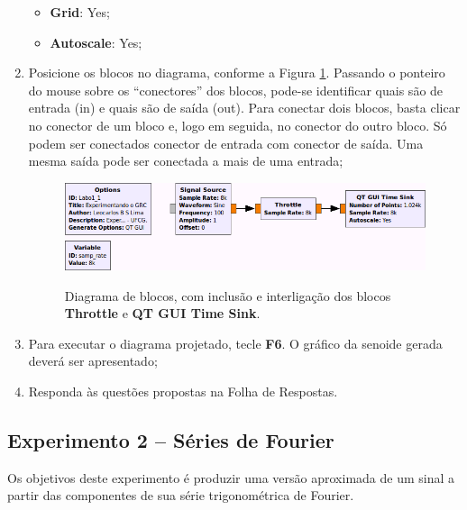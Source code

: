\documentclass[12pt,addpoints]{exam}
\newcommand{\myscale}{0.4}
\begin{document}
\begin{enumerate}
    \begin{itemize}
        \item \textbf{Grid}: Yes;
        \item \textbf{Autoscale}: Yes;
    \end{itemize}
    \item Posicione os blocos no diagrama, conforme a Figura \ref{fig:GRC_1-1d}. Passando o ponteiro do mouse sobre os ``conectores'' dos blocos, pode-se identificar quais são de entrada (in) e quais são de saída (out). Para conectar dois blocos, basta clicar no conector de um bloco e, logo em seguida, no conector do outro bloco. Só podem ser conectados conector de entrada com conector de saída. Uma mesma saída pode ser conectada a mais de uma entrada;
    \begin{figure}[htb]
        \centering
        \includegraphics[scale=\myscale]{./Figuras/GRC_1-1d} \\
        \caption{Diagrama de blocos, com inclusão e interligação dos blocos \textbf{Throttle} e \textbf{QT GUI Time Sink}.} 
        \label{fig:GRC_1-1d}
    \end{figure}
    \item Para executar o diagrama projetado, tecle \textbf{F6}. O gráfico da senoide gerada deverá ser apresentado;
    \item Responda às questões propostas na Folha de Respostas.
\end{enumerate}

\subsection{Experimento 2 -- Séries de Fourier}

Os objetivos deste experimento é produzir uma versão aproximada de um sinal a partir das componentes de sua série trigonométrica de Fourier.
\end{document}
